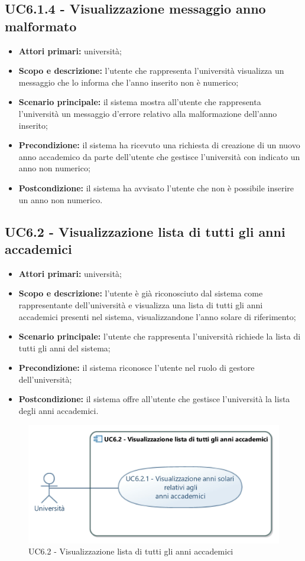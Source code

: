 \documentclass[AnalisiDeiRequisiti.tex]{subfiles}
\begin{document}
\subsection{UC6.1.4 - Visualizzazione messaggio anno malformato}
\begin{itemize}
	\item \textbf{Attori primari:} università;
	\item \textbf{Scopo e descrizione:} l'utente che rappresenta l'università visualizza un messaggio che lo informa che l'anno inserito non è numerico;
	\item \textbf{Scenario principale:} il sistema mostra all'utente che rappresenta l'università un messaggio d'errore relativo alla malformazione dell'anno inserito;
	\item \textbf{Precondizione:} il sistema ha ricevuto una richiesta di creazione di un nuovo anno accademico da parte dell'utente che gestisce l'università con indicato un anno non numerico; 
	\item \textbf{Postcondizione:} il sistema ha avvisato l'utente che non è possibile inserire un anno non numerico.
\end{itemize}

\subsection{UC6.2 - Visualizzazione lista di tutti gli anni accademici}
\begin{itemize}
	\item \textbf{Attori primari:} università;
	\item \textbf{Scopo e descrizione:} l'utente è già riconosciuto dal sistema come rappresentante dell'università e visualizza una lista di tutti gli anni accademici presenti nel sistema, visualizzandone l'anno solare di riferimento;
	\item \textbf{Scenario principale:} l'utente che rappresenta l'università richiede la lista di tutti gli anni del sistema;
	\item \textbf{Precondizione:} il sistema riconosce l'utente nel ruolo di gestore dell'università;
	\item \textbf{Postcondizione:} il sistema offre all'utente che gestisce l'università la lista degli anni accademici.
\end{itemize}
\begin{figure}[H]
	\centering
	\includegraphics[width=0.7\linewidth]{UC6_2.jpg}
	\caption{UC6.2 - Visualizzazione lista di tutti gli anni accademici}
	\label{fig:UC6.2 - Visualizzazione lista di tutti gli anni accademici}
\end{figure}
\end{document}
